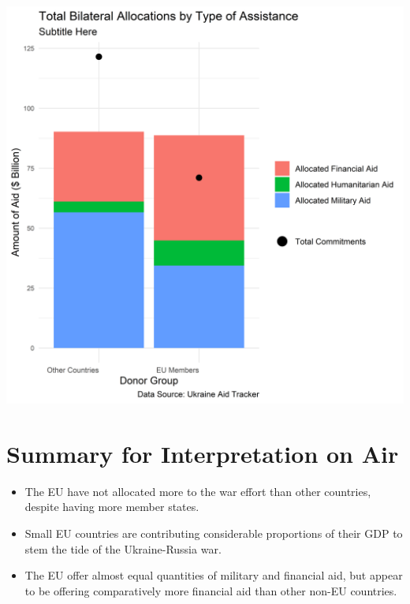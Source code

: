 \documentclass[11pt,preprint, authoryear]{elsarticle}
\let\origfigure\figure
\let\endorigfigure\endfigure
\renewenvironment{figure}[1][2] {
    \expandafter\origfigure\expandafter[H]
} {
    \endorigfigure
}
\numberwithin{equation}{section}
\numberwithin{figure}{section}
\numberwithin{table}{section}
\begin{document}
\begin{figure}[H]

{\centering \includegraphics{Question_3_files/figure-latex/Figure3-1} 

}

\caption{Aid Type \label{Figure3}}\label{fig:Figure3}
\end{figure}

\hypertarget{summary-for-interpretation-on-air}{%
\section{Summary for Interpretation on
Air}\label{summary-for-interpretation-on-air}}

\begin{itemize}
\item
  The EU have not allocated more to the war effort than other countries,
  despite having more member states.
\item
  Small EU countries are contributing considerable proportions of their
  GDP to stem the tide of the Ukraine-Russia war.
\item
  The EU offer almost equal quantities of military and financial aid,
  but appear to be offering comparatively more financial aid than other
  non-EU countries.
\end{itemize}
\end{document}
